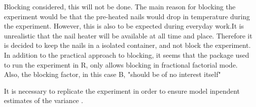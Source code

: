 Blocking considered, this will not be done. The main reason for blocking the experiment would be that the pre-heated nails would drop in temperature during the experiment. However, this is also to be expected during everyday work.It is unrealistic that the nail heater will be available at all time and place. Therefore it is decided to keep the nails in a isolated container, and not block the experiment. In addition to the practical approach to blocking, it seems that the package used to run the experiment in R, only allows blocking in fractional factorial mode. Also, the blocking factor, in this case B, "should be of no interest itself" \parencite[10]{frf2}

It is necessary to replicate the experiment in order to ensure model inpendent estimates of the variance \parencite[11]{tyssedal}.